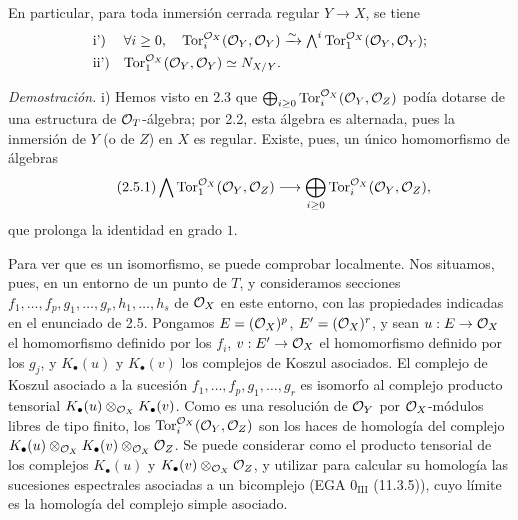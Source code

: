 En particular, para toda inmersión cerrada regular \(Y\to X\), se tiene
\[
\begin{array}{ll}
\text{i')}& \forall i\ge0,\quad
\Tor_i^{\cO_X}(\cO_Y,\cO_Y)\xrightarrow{\sim}
\bigwedge^i\Tor_1^{\cO_X}(\cO_Y,\cO_Y);\\[0.8ex]
\text{ii')}&
\Tor_1^{\cO_X}(\cO_Y,\cO_Y)\simeq \sisi{N_{Y/X}}{N_{X/Y}}.
\end{array}
\]

\emph{Demostración.} i) Hemos visto en 2.3 que \(\bigoplus_{i\ge0}\Tor_i^{\cO_X}(\cO_Y,\cO_Z)\) podía dotarse de una estructura de \(\cO_T\)-álgebra; por 2.2, esta álgebra es alternada, pues la inmersión de \(Y\) (o de \(Z\)) en \(X\) es regular. Existe, pues, un único homomorfismo de álgebras
\begin{equation}\tag{2.5.1}
\bigwedge \Tor_1^{\cO_X}(\cO_Y,\cO_Z)\longrightarrow
\bigoplus_{i\ge0}\Tor_i^{\cO_X}(\cO_Y,\cO_Z),
\end{equation}
que prolonga la identidad en grado \(1\).

Para ver que es un isomorfismo, se puede comprobar localmente. Nos situamos, pues, en un entorno de un punto de \(T\), y consideramos secciones \(f_1,\ldots,f_p,g_1,\ldots,g_r,h_1,\ldots,h_s\) de \(\cO_X\) en este entorno, con las propiedades indicadas en el enunciado de 2.5. Pongamos \(E=(\cO_X)^p\), \(E'=(\cO_X)^r\), y sean \(u:E\to\cO_X\) el homomorfismo definido por los \(f_i\), \(v:E'\to\cO_X\) el homomorfismo definido por los \(g_j\), y \(K_\bullet(u)\) y \(K_\bullet(v)\) los complejos de Koszul asociados. El complejo de Koszul asociado a la sucesión \(f_1,\ldots,f_p,g_1,\ldots,g_r\) es isomorfo al complejo producto tensorial \(K_\bullet(u)\otimes_{\cO_X}K_\bullet(v)\). Como es una resolución de \(\cO_Y\) por \(\cO_X\)-módulos libres de tipo finito, los \(\Tor_i^{\cO_X}(\cO_Y,\cO_Z)\) son los haces de homología del complejo \(K_\bullet(u)\otimes_{\cO_X}K_\bullet(v)\otimes_{\cO_X}\cO_Z\). Se puede considerar como el producto tensorial de los complejos \(K_\bullet(u)\) y \(K_\bullet(v)\otimes_{\cO_X}\cO_Z\), y utilizar para calcular su homología las sucesiones espectrales asociadas a un bicomplejo (EGA \(0_{\mathrm{III}}\) (11.3.5)), cuyo límite es la homología del complejo simple asociado.

